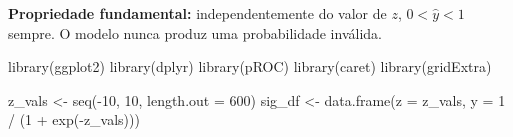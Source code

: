 \documentclass[
  letterpaper,
  DIV=11,
  numbers=noendperiod]{scrartcl}
\newenvironment{Shaded}{\begin{snugshade}}{\end{snugshade}}
\newcommand{\AttributeTok}[1]{\textcolor[rgb]{0.40,0.45,0.13}{#1}}
\newcommand{\DecValTok}[1]{\textcolor[rgb]{0.68,0.00,0.00}{#1}}
\newcommand{\FunctionTok}[1]{\textcolor[rgb]{0.28,0.35,0.67}{#1}}
\newcommand{\NormalTok}[1]{\textcolor[rgb]{0.00,0.23,0.31}{#1}}
\newcommand{\OtherTok}[1]{\textcolor[rgb]{0.00,0.23,0.31}{#1}}
\newcommand{\SpecialCharTok}[1]{\textcolor[rgb]{0.37,0.37,0.37}{#1}}
\begin{document}
\textbf{Propriedade fundamental:} independentemente do valor de \(z\),
\(0 < \hat{y} < 1\) sempre. O modelo nunca produz uma probabilidade
inválida.

\begin{Shaded}
\begin{Highlighting}[]
\FunctionTok{library}\NormalTok{(ggplot2)}
\FunctionTok{library}\NormalTok{(dplyr)}
\FunctionTok{library}\NormalTok{(pROC)}
\FunctionTok{library}\NormalTok{(caret)}
\FunctionTok{library}\NormalTok{(gridExtra)}

\NormalTok{z\_vals }\OtherTok{\textless{}{-}} \FunctionTok{seq}\NormalTok{(}\SpecialCharTok{{-}}\DecValTok{10}\NormalTok{, }\DecValTok{10}\NormalTok{, }\AttributeTok{length.out =} \DecValTok{600}\NormalTok{)}
\NormalTok{sig\_df }\OtherTok{\textless{}{-}} \FunctionTok{data.frame}\NormalTok{(}\AttributeTok{z =}\NormalTok{ z\_vals, }\AttributeTok{y =} \DecValTok{1} \SpecialCharTok{/}\NormalTok{ (}\DecValTok{1} \SpecialCharTok{+} \FunctionTok{exp}\NormalTok{(}\SpecialCharTok{{-}}\NormalTok{z\_vals)))}


\end{Highlighting}
\end{Shaded}
\end{document}
